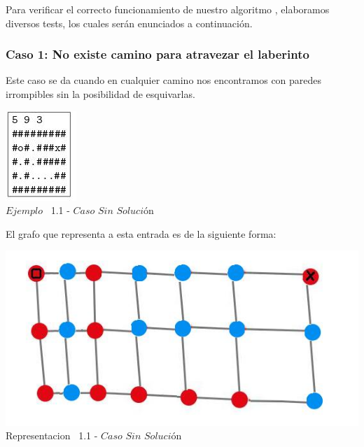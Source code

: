 \indent Para verificar el correcto funcionamiento de nuestro algoritmo , elaboramos diversos tests,
los cuales ser\'an enunciados a continuaci\'on.\\

\begin{center}
 \subsubsection*{Caso 1: No existe camino para atravezar el laberinto}
\end{center}

Este caso se da cuando en cualquier camino nos encontramos con paredes irrompibles sin la posibilidad de esquivarlas.\\
 
\vspace*{0.3cm} \vspace*{0.3cm}
  \begin{center}
 \includegraphics[scale=1.60]{./EJ1/ej1sinsolucion.jpeg}
\\{$Ejemplo$ \ 1.1 - $Caso$ $Sin$ $Soluci$\'on}
  \end{center}
  \vspace*{0.3cm}

El grafo que representa a esta entrada es de la siguiente forma:\\

\vspace*{0.3cm} \vspace*{0.3cm}
  \begin{center}
 \includegraphics[scale=0.5]{./EJ1/ej1grafosinsolucion.jpeg}
 \\{Representacion \ 1.1 - $Caso$ $Sin$ $Soluci$\'on}
  \end{center}
  \vspace*{0.3cm}

